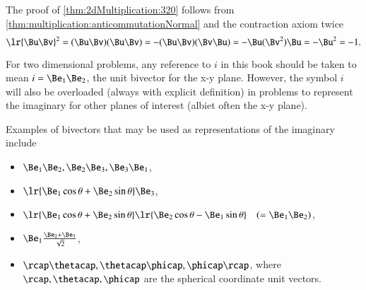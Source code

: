 %
%

The proof of \cref{thm:2dMultiplication:320} follows from \cref{thm:multiplication:anticommutationNormal} and the
contraction axiom twice
\begin{dmath}\label{eqn:2dMultiplication:220}
   \lr{ \Bu \Bv }^2
   =
   (\Bu \Bv)(\Bu \Bv)
   =
   -(\Bu \Bv)(\Bv \Bu)
   =
   -\Bu (\Bv^2 ) \Bu
   =
   -\Bu^2
   = -1.
\end{dmath}

For two dimensional problems, any reference to \( i \) in this book should be taken to mean \( i = \Be_1 \Be_2 \), the unit bivector for the x-y plane.
However, the symbol \( i \) will also be overloaded (always with explicit definition) in  problems to represent the imaginary for other planes of interest (albiet often the x-y plane).

Examples of bivectors that may be used as representations of the imaginary include
\begin{itemize}
\item \( \Be_1 \Be_2, \Be_2 \Be_3, \Be_3 \Be_1 \),
\item \( \lr{ \Be_1 \cos\theta + \Be_2 \sin\theta } \Be_3 \),
\item \( \lr{ \Be_1 \cos\theta + \Be_2 \sin\theta } \lr{ \Be_2 \cos\theta - \Be_1 \sin\theta } \quad (= \Be_1 \Be_2)\),
\item \( \Be_1 \frac{ \Be_2 + \Be_3}{\sqrt{2}} \),
\item \( \rcap \thetacap, \thetacap \phicap, \phicap \rcap \), where \( \rcap, \thetacap, \phicap \) are the spherical coordinate unit vectors.
\end{itemize}


